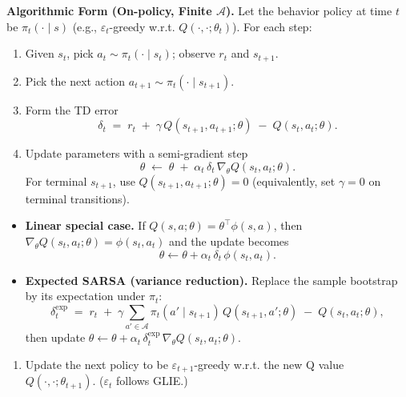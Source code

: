 \documentclass[
]{book}
\providecommand{\tightlist}{%
  \setlength{\itemsep}{0pt}\setlength{\parskip}{0pt}}
\theoremstyle{definition}
\theoremstyle{definition}
\theoremstyle{definition}
\theoremstyle{definition}
\theoremstyle{remark}
\begin{document}
\textbf{Algorithmic Form (On-policy, Finite \(\mathcal A\)).} Let the behavior policy at time \(t\) be \(\pi_t(\cdot\mid s)\) (e.g., \(\varepsilon_t\)-greedy w.r.t. \(Q(\cdot,\cdot;\theta_t)\)). For each step:

\begin{enumerate}
\def\labelenumi{\arabic{enumi}.}
\item
  Given \(s_t\), pick \(a_t \sim \pi_t(\cdot \mid s_t)\); observe \(r_t\) and \(s_{t+1}\).
\item
  Pick the next action \(a_{t+1} \sim \pi_t(\cdot\mid s_{t+1})\).
\item
  Form the TD error
  \begin{equation}
  \delta_t \;=\; r_t \;+\; \gamma\, Q(s_{t+1},a_{t+1};\theta) \;-\; Q(s_t,a_t;\theta).
  \label{eq:SARSA-TDerror}
  \end{equation}
\item
  Update parameters with a semi-gradient step
  \begin{equation}
  \theta \;\leftarrow\; \theta \;+\; \alpha_t\, \delta_t \,\nabla_\theta Q(s_t,a_t;\theta).
  \label{eq:SARSA-Update}
  \end{equation}
  For terminal \(s_{t+1}\), use \(Q(s_{t+1},a_{t+1};\theta)=0\) (equivalently, set \(\gamma=0\) on terminal transitions).
\end{enumerate}

\begin{itemize}
\item
  \textbf{Linear special case.} If \(Q(s,a;\theta)=\theta^\top \phi(s,a)\), then \(\nabla_\theta Q(s_t,a_t;\theta)=\phi(s_t,a_t)\) and the update becomes
  \[
  \theta \leftarrow \theta + \alpha_t\, \delta_t\, \phi(s_t,a_t).
  \]
\item
  \textbf{Expected SARSA (variance reduction).} Replace the sample bootstrap by its expectation under \(\pi_t\):
  \begin{equation}
  \delta_t^{\text{exp}} \;=\; r_t \;+\; \gamma \sum_{a'\in\mathcal A} \pi_t(a'\mid s_{t+1})\, Q(s_{t+1},a';\theta) \;-\; Q(s_t,a_t;\theta),
  \label{eq:ExpectedSARSA}
  \end{equation}
  then update \(\theta \leftarrow \theta + \alpha_t\, \delta_t^{\text{exp}}\, \nabla_\theta Q(s_t,a_t;\theta)\).
\end{itemize}

\begin{enumerate}
\def\labelenumi{\arabic{enumi}.}
\setcounter{enumi}{4}
\tightlist
\item
  Update the next policy to be \(\varepsilon_{t+1}\)-greedy w.r.t. the new Q value \(Q(\cdot, \cdot; \theta_{t+1})\). (\(\varepsilon_t\) follows GLIE.)
\end{enumerate}
\end{document}
